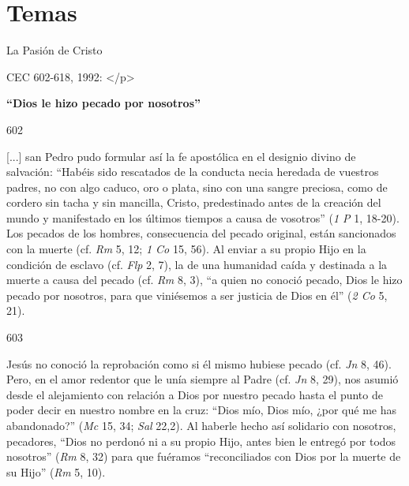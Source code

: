 			\section{Temas}
			
			\begin{ccetheme}La Pasión de Cristo \end{ccetheme}
			
			\begin{ccereference}\end{ccereference}CEC 602-618, 1992: </p>
			
			\begin{ccebody}\textbf{“Dios le hizo pecado por nosotros”}\end{ccebody}
			
			\begin{ccebody}\begin{ccenumber}602\end{ccenumber} [...] san Pedro pudo formular así la fe apostólica en el designio divino de salvación: “Habéis sido rescatados de la conducta necia heredada de vuestros padres, no con algo caduco, oro o plata, sino con una sangre preciosa, como de cordero sin tacha y sin mancilla, Cristo, predestinado antes de la creación del mundo y manifestado en los últimos tiempos a causa de vosotros” (\textit{1 P} 1, 18-20). Los pecados de los hombres, consecuencia del pecado original, están sancionados con la muerte (cf. \textit{Rm} 5, 12; \textit{1 Co} 15, 56). Al enviar a su propio Hijo en la condición de esclavo (cf. \textit{Flp} 2, 7), la de una humanidad caída y destinada a la muerte a causa del pecado (cf. \textit{Rm} 8, 3), “a quien no conoció pecado, Dios le hizo pecado por nosotros, para que viniésemos a ser justicia de Dios en él” (\textit{2 Co} 5, 21).\end{ccebody}
			
			\begin{ccebody}\begin{ccenumber}603\end{ccenumber} Jesús no conoció la reprobación como si él mismo hubiese pecado (cf. \textit{Jn} 8, 46). Pero, en el amor redentor que le unía siempre al Padre (cf. \textit{Jn} 8, 29), nos asumió desde el alejamiento con relación a Dios por nuestro pecado hasta el punto de poder decir en nuestro nombre en la cruz: “Dios mío, Dios mío, ¿por qué me has abandonado?” (\textit{Mc} 15, 34; \textit{Sal} 22,2). Al haberle hecho así solidario con nosotros, pecadores, “Dios no perdonó ni a su propio Hijo, antes bien le entregó por todos nosotros” (\textit{Rm} 8, 32) para que fuéramos “reconciliados con Dios por la muerte de su Hijo” (\textit{Rm} 5, 10).\end{ccebody}
			
